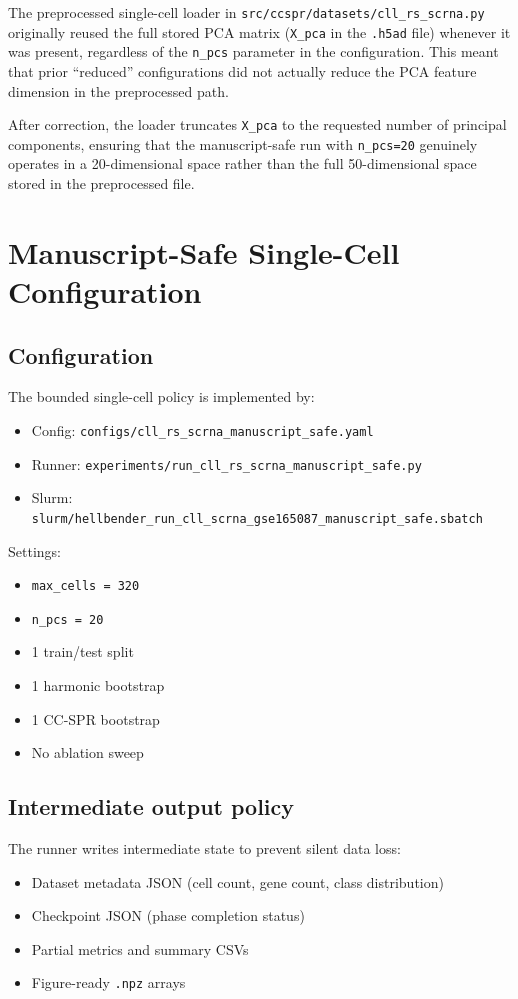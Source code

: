 \documentclass[11pt]{article}
\begin{document}
The preprocessed single-cell loader in \texttt{src/ccspr/datasets/cll\_rs\_scrna.py} originally reused the full stored PCA matrix (\texttt{X\_pca} in the \texttt{.h5ad} file) whenever it was present, regardless of the \texttt{n\_pcs} parameter in the configuration.
This meant that prior ``reduced'' configurations did not actually reduce the PCA feature dimension in the preprocessed path.

After correction, the loader truncates \texttt{X\_pca} to the requested number of principal components, ensuring that the manuscript-safe run with \texttt{n\_pcs=20} genuinely operates in a 20-dimensional space rather than the full 50-dimensional space stored in the preprocessed file.

\section{Manuscript-Safe Single-Cell Configuration}

\subsection{Configuration}
The bounded single-cell policy is implemented by:
\begin{itemize}[leftmargin=1.5em]
\item Config: \texttt{configs/cll\_rs\_scrna\_manuscript\_safe.yaml}
\item Runner: \texttt{experiments/run\_cll\_rs\_scrna\_manuscript\_safe.py}
\item Slurm: \texttt{slurm/hellbender\_run\_cll\_scrna\_gse165087\_manuscript\_safe.sbatch}
\end{itemize}

Settings:
\begin{itemize}[leftmargin=1.5em]
\item \texttt{max\_cells = 320}
\item \texttt{n\_pcs = 20}
\item 1 train/test split
\item 1 harmonic bootstrap
\item 1 CC-SPR bootstrap
\item No ablation sweep
\end{itemize}

\subsection{Intermediate output policy}
The runner writes intermediate state to prevent silent data loss:
\begin{itemize}[leftmargin=1.5em]
\item Dataset metadata JSON (cell count, gene count, class distribution)
\item Checkpoint JSON (phase completion status)
\item Partial metrics and summary CSVs
\item Figure-ready \texttt{.npz} arrays
\end{itemize}
\end{document}
